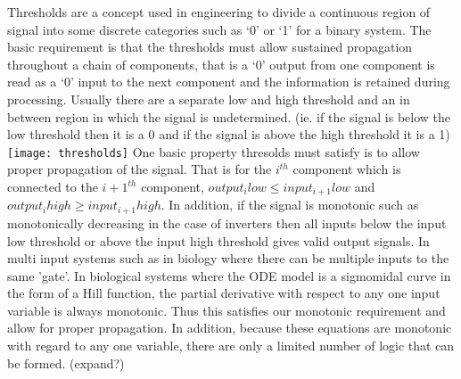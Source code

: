 \documentclass{article}
\begin{document}
\newline \newline
Thresholds are a concept used in engineering to divide a continuous region of signal into some discrete categories such as ‘0’ or ‘1’ for a binary system.  The basic requirement is that the thresholds must allow sustained propagation throughout a chain of components, that is a ‘0’ output from one component is read as a ‘0’ input to the next component and the information is retained during processing.  Usually there are a separate low and high threshold and an in between region in which the signal is undetermined. (ie. if the signal is below the low threshold then it is a 0 and if the signal is above the high threshold it is a 1)
\newline
\texttt{[image: thresholds]}
\newline
One basic property thresolds must satisfy is to allow proper propagation of the signal.  That is for the $i^{th}$ component which is connected to the $i+1^{th}$ component, $output_i low \leq input_{i+1} low$ and $output_i high \geq input_{i+1} high$.  In addition, if the signal is monotonic such as monotonically decreasing in the case of inverters then all inputs below the input low threshold or above the input high threshold gives valid output signals.  In multi input systems such as in biology where there can be multiple inputs to the same 'gate'.  In biological systems where the ODE model is a sigmomidal curve in the form of a Hill function, the partial derivative with respect to any one input variable is always monotonic.  Thus this satisfies our monotonic requirement and allow for proper propagation.  In addition, because these equations are monotonic with regard to any one variable, there are only a limited number of logic that can be formed.  (expand?)
\end{document}
